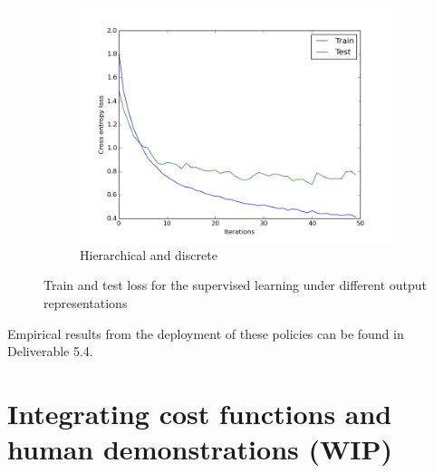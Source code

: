 \documentclass[a4paper,11pt]{report}
\begin{document}
\begin{figure}[t]
    \begin{subfigure}[b]{0.45\columnwidth}
    \includegraphics[clip=true,width=1.\textwidth]{figures/dh_xent.png}
    \caption{Hierarchical and discrete}
    \label{fig:hier_discrete_results}
  \end{subfigure} 

  \caption[SL train test]{Train and test loss for the supervised learning under different output representations}
  \label{fig:SL_results}
\end{figure}

Empirical results from the deployment of these policies can be found in Deliverable 5.4. 

\clearpage


\section{Integrating cost functions and human demonstrations (WIP)} \label{sec:sl+rl}
\end{document}
